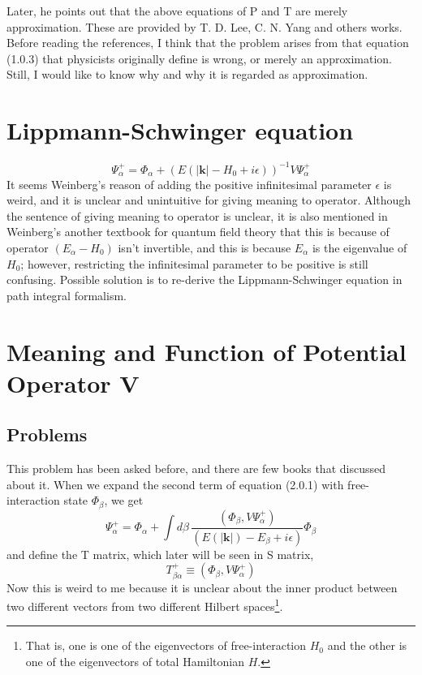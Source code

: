 \documentclass[12pt]{article}
\numberwithin{equation}{subsection}
\begin{document}
Later, he points out that the above equations of P and T are merely approximation.
These are provided by T. D. Lee, C. N. Yang and others works\cite{PhysRev.104.254}\cite{PhysRevLett.13.138}. 
Before reading the references, I think that the problem arises from that equation (1.0.3) that physicists originally define is wrong, or merely an approximation.
Still, I would like to know why and why it is regarded as approximation.
\section{Lippmann-Schwinger equation}
\begin{equation}
    \Psi_{\alpha}^{+} = \Phi_{\alpha}+\left(E(|\mathbf{k}|-H_{0}+i\epsilon)\right)^{-1}V\Psi_{\alpha}^{+}
\end{equation}
It seems Weinberg's reason\cite{Weinberg_2015} of adding the positive infinitesimal parameter $\epsilon$ is weird, and it is unclear and unintuitive for giving meaning to operator.
Although the sentence of giving meaning to operator is unclear, it is also mentioned in Weinberg's another textbook for quantum field theory\cite{Weinberg_1995_3} that this is because of operator $(E_{\alpha}-H_0)$ isn't invertible, and this is because $E_{\alpha}$ is the eigenvalue of $H_0$; however, restricting the infinitesimal parameter to be positive is still confusing.
Possible solution is to re-derive the Lippmann-Schwinger equation\cite{PhysRev.79.469} in path integral formalism.

\section{Meaning and Function of Potential Operator V}
\subsection{Problems}
This problem has been asked before\cite{676400}, and there are few books that discussed about it.
When we expand the second term of equation (2.0.1) with free-interaction state $\Phi_{\beta}$, we get
\begin{equation}
    \Psi_{\alpha}^{+} = \Phi_{\alpha} + \int{d\beta\,\frac{(\Phi_{\beta}, V\Psi_{\alpha}^{+})}{(E(|\mathbf{k}|)-E_{\beta}+i\epsilon)}\Phi_{\beta}}
\end{equation}
and define the T matrix, which later will be seen in S matrix,
\begin{equation}
    T_{\beta\alpha}^{+} \equiv (\Phi_{\beta}, V\Psi_{\alpha}^{+})
\end{equation}
Now this is weird to me because it is unclear about the inner product between two different vectors from two different Hilbert spaces\footnote{That is, one is one of the eigenvectors of free-interaction $H_0$ and the other is one of the eigenvectors of total Hamiltonian $H$.}.
\end{document}
